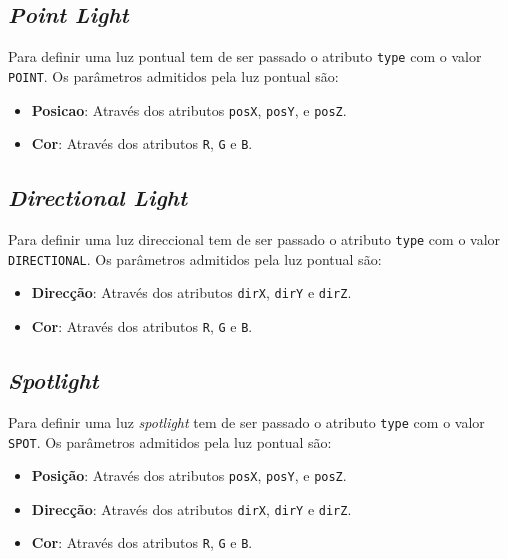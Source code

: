 \documentclass[a4paper]{article}
\begin{document}
\subsection{\textit{Point Light}}

Para definir uma luz pontual tem de ser passado o atributo \texttt{type} com o
valor \texttt{POINT}. Os parâmetros admitidos pela luz pontual são:

\begin{itemize}
    \item \textbf{Posicao}: Através dos atributos \texttt{posX}, \texttt{posY},
        e \texttt{posZ}.
    \item \textbf{Cor}: Através dos atributos \texttt{R}, \texttt{G} e
        \texttt{B}.
\end{itemize}

\subsection{\textit{Directional Light}}

Para definir uma luz direccional tem de ser passado o atributo \texttt{type}
com o valor \texttt{DIRECTIONAL}. Os parâmetros admitidos pela luz pontual são:

\begin{itemize}
    \item \textbf{Direcção}: Através dos atributos \texttt{dirX}, \texttt{dirY}
        e \texttt{dirZ}.
    \item \textbf{Cor}: Através dos atributos \texttt{R}, \texttt{G} e
        \texttt{B}.
\end{itemize}

\subsection{\textit{Spotlight}}

Para definir uma luz \textit{spotlight} tem de ser passado o atributo
\texttt{type} com o valor \texttt{SPOT}. Os parâmetros admitidos pela luz
pontual são:

\begin{itemize}
    \item \textbf{Posição}: Através dos atributos \texttt{posX}, \texttt{posY},
        e \texttt{posZ}.
    \item \textbf{Direcção}: Através dos atributos \texttt{dirX}, \texttt{dirY}
        e \texttt{dirZ}.
    \item \textbf{Cor}: Através dos atributos \texttt{R}, \texttt{G} e
        \texttt{B}.
\end{itemize}
\end{document}
